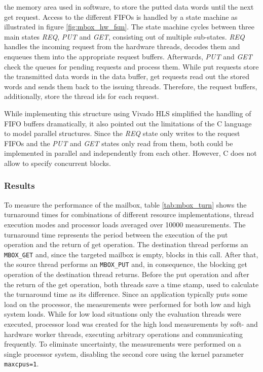 the memory area used in software, to store the putted data words until the
next get request. Access to the different \acp{FIFO} is handled by a state
machine as illustrated in figure \ref{fig:mbox_hw_fsm}. The state machine
cycles between three main states \emph{REQ}, \emph{PUT} and \emph{GET},
consisting out of multiple sub-states. \emph{REQ} handles the incoming request
from the hardware threads, decodes them and enqueues them into the appropriate
request buffers. Afterwards, \emph{PUT} and \emph{GET} check the queues for
pending requests and process them. While put requests store the transmitted
data words in the data buffer, get requests read out the stored words and
sends them back to the issuing threads. Therefore, the request buffers,
additionally, store the thread ids for each request.

While implementing this structure using Vivado HLS simplified the handling of
\ac{FIFO} buffers dramatically, it also pointed out the limitations of the C
language to model parallel structures. Since the \emph{REQ} state only writes
to the request \acp{FIFO} and the \emph{PUT} and \emph{GET} states only read
from them, both could be implemented in parallel and independently from each
other. However, C does not allow to specify concurrent blocks.

\subsubsection{Results}
To measure the performance of the mailbox, table \ref{tab:mbox_turn} shows the
turnaround times for combinations of different resource implementations,
thread execution modes and processor loads averaged over 10000 measurements.
The turnaround time represents the period between the execution of the put
operation and the return of get operation. The destination thread performs an
\lstinline{MBOX_GET} and, since the targeted mailbox is empty, blocks in this
call. After that, the source thread performs an \lstinline{MBOX_PUT} and, in
consequence, the blocking get operation of the destination thread returns.
Before the put operation and after the return of the get operation, both
threads save a time stamp, used to calculate the turnaround time as its
difference. Since an application typically puts some load on the processor,
the measurements were performed for both low and high system loads. While for
low load situations only the evaluation threads were executed, processor load
was created for the high load measurements by soft- and hardware worker
threads, executing arbitrary operations and communicating frequently. To
eliminate uncertainty, the measurements were performed on a single processor
system, disabling the second core using the kernel parameter
\lstinline{maxcpus=1}.

